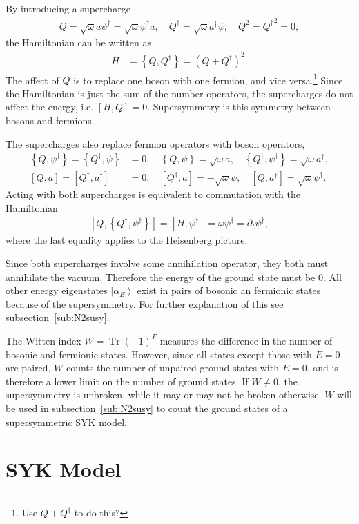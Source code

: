 \documentclass[12pt]{article} %
\newcommand{\om}{\omega}
\newcommand{\ket}[1]{\left|#1\right\rangle}
\newcommand{\comm}[2]{\left[#1,#2\right]}
\newcommand{\acom}[2]{\left\{#1,#2\right\}}
\newcommand{\nn}{\nonumber\\}
\DeclareMathOperator{\Tr}{Tr}
\begin{document}
By introducing a supercharge 
\begin{align}
Q = \sqrt{\om}a\psi^\dag = \sqrt{\om}\psi^\dag a,\quad Q^\dag = \sqrt{\om} 
	a^\dag\psi ,\quad Q^2 ={ Q^\dag}^2 = 0,
\end{align}
the Hamiltonian can be written as 
\begin{align}
H &= \acom{Q}{Q^\dag} = \left(Q+Q^\dag \right)^2.
\end{align}
The affect of $Q$ is to replace one boson with one fermion, and vice versa.\footnote{Use $Q+Q^\dag$ to do this?} Since the Hamiltonian is just the sum of the number operators, the supercharges do not affect the energy, i.e. $\comm{H}{Q} = 0$. Supersymmetry is this symmetry between bosons and fermions.

The supercharges also replace fermion operators with boson operators,
\begin{align}
\acom{Q}{\psi^\dag} = \acom{Q^\dag}{\psi} &= 0,\quad \acom{Q}{\psi} = 
	\sqrt{\om} a,\quad \acom{Q^\dag}{\psi^\dag} = \sqrt{\om} a^\dag,\nn
\comm{Q}{a} = \comm{Q^\dag}{a^\dag} &= 0,\quad \comm{Q^\dag}{a} = 
	-\sqrt{\om}\psi, \quad \comm{Q}{a^\dag} = \sqrt{\om}\psi^\dag.
\end{align}
Acting with both supercharges is equivalent to commutation with the Hamiltonian
\begin{align}
\comm{Q}{\acom{Q^\dag}{\psi^\dag}} = \comm{H}{\psi^\dag} = \om \psi^\dag = \partial_t\psi^\dag,
\end{align}
where the last equality applies to the Heisenberg picture. 

Since both supercharges involve some annihilation operator, they both must annihilate the vacuum. Therefore the energy of the ground state must be 0. All other energy eigenstates $\ket{\alpha_E}$ exist in pairs of bosonic an fermionic states because of the supersymmetry. For further explanation of this see subsection~\ref{sub:N2susy}.

The Witten index $W = \Tr(-1)^F$ measures the difference in the number of bosonic and fermionic states. However, since all states except those with $E=0$ are paired, $W$ counts the number of unpaired ground states with $E=0$, and is therefore a lower limit on the number of ground states. If $W\ne0$, the supersymmetry is unbroken, while it may or may not be broken otherwise. $W$ will be used in subsection~\ref{sub:N2susy} to count the ground states of a supersymmetric SYK model.

\section{SYK Model} \label{sec:syk}
\end{document}

